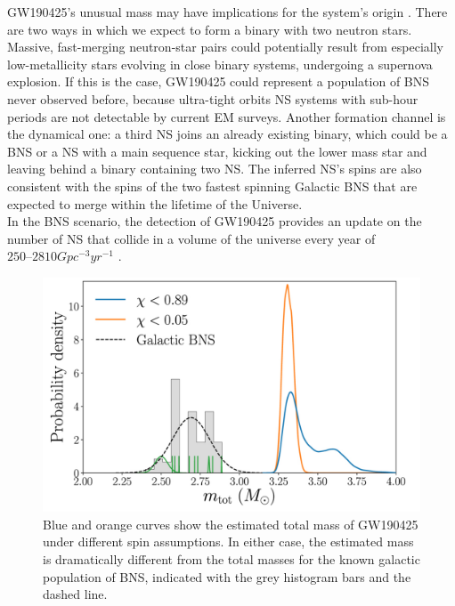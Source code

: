\documentclass[binding=0.6cm, LaM]{sapthesis}
\begin{document}
	GW190425’s unusual mass may have implications for the system’s origin \cite{148}.
	There are two ways in which we expect to form a binary with two neutron stars. 
	Massive, fast-merging neutron-star pairs could potentially result from 
	especially low-metallicity stars evolving in close binary systems, undergoing a supernova explosion.
	If this is the case, GW190425 could represent a population of BNS never observed before, 
	because ultra-tight orbits NS systems with sub-hour periods are not detectable by current EM surveys.
	Another formation channel is the dynamical one: a third NS joins an already existing binary, 
	which could be a BNS or a NS with a main sequence star, kicking out the
	lower mass star and leaving behind a binary containing two NS.
	The inferred NS’s spins are also consistent with the spins of the two fastest 
	spinning Galactic BNS that are expected to merge within the lifetime of the Universe. \\
	In the BNS scenario, the detection of GW190425 provides an update 
	on the number of NS that collide in a volume of the universe every year of $250–2810 Gpc^{-3}yr^{-1}$ \cite{62}.
		\begin{figure}[H]
                        \label{secondbns}
                        \includegraphics[scale=0.3]{secondbns}
                        \centering
                        \caption{Blue and orange curves show the estimated total mass of GW190425 under different spin assumptions. In either case, the estimated mass is dramatically different from the total masses for the known galactic population of BNS, indicated with the grey histogram bars and the dashed line. \cite{62}}
		        \label{fig:secondbns}
                \end{figure}
\end{document}

